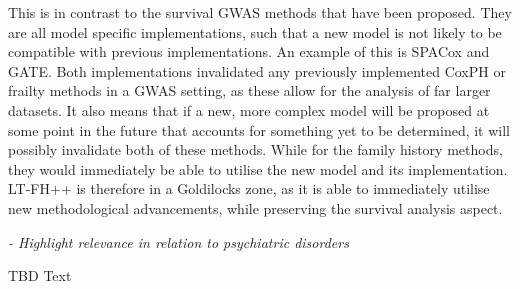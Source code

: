This is in contrast to the survival GWAS methods that have been proposed. They are all model specific implementations, such that a new model is not likely to be compatible with previous implementations. An example of this is SPACox and GATE. Both implementations invalidated any previously implemented CoxPH or frailty methods in a GWAS setting, as these allow for the analysis of far larger datasets. It also means that if a new, more complex model will be proposed at some point in the future that accounts for something yet to be determined, it will possibly invalidate both of these methods. While for the family history methods, they would immediately be able to utilise the new model and its implementation. LT-FH++ is therefore in a Goldilocks zone, as it is able to immediately utilise new methodological advancements, while preserving the survival analysis aspect.    


{\itshape
- Highlight relevance in relation to psychiatric disorders
}

TBD Text


